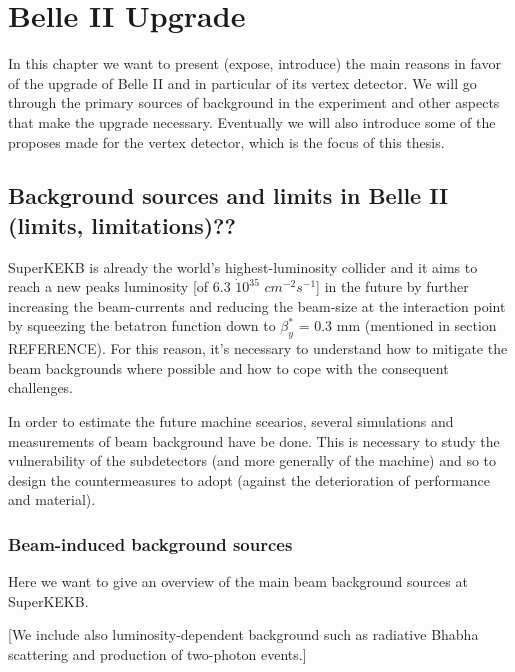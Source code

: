 \chapter{Belle II Upgrade}

In this chapter we want to present (expose, introduce) the main reasons in favor of the upgrade of Belle II and in particular of its vertex detector. We will go through the primary sources of background in the experiment and other aspects that make the upgrade necessary. Eventually we will also introduce some of the proposes made for the vertex detector, which is the focus of this thesis.

\section{Background sources and limits in Belle II (limits, limitations)??}

SuperKEKB is already the world's highest-luminosity collider and it aims to reach a new peaks luminosity [of 6.3 $\dot 10^{35}$ $cm^{-2}s^{-1}$] in the future by further increasing the beam-currents and reducing the beam-size at the interaction point by squeezing the betatron function down to $\beta^{*}_{y}$ = 0.3 mm (mentioned in section REFERENCE). For this reason, it's necessary to understand how to mitigate the beam backgrounds where possible and how to cope with the consequent challenges. 

In order to estimate the future machine scearios, several simulations and measurements of beam background have be done. This is necessary to study the vulnerability of the subdetectors (and more generally of the machine) and so to design the countermeasures to adopt (against the deterioration of performance and material). 

\subsection{Beam-induced background sources}

Here we want to give an overview of the main beam background sources at SuperKEKB. 

[We include also luminosity-dependent background such as radiative Bhabha scattering and production of two-photon events.]



